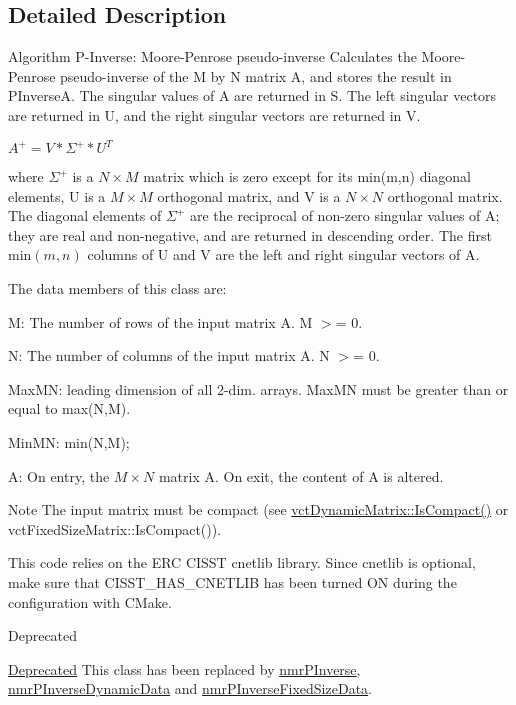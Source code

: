 \subsection{Detailed Description}
Algorithm P-\/\-Inverse\-: Moore-\/\-Penrose pseudo-\/inverse Calculates the Moore-\/\-Penrose pseudo-\/inverse of the M by N matrix A, and stores the result in P\-Inverse\-A. The singular values of A are returned in S. The left singular vectors are returned in U, and the right singular vectors are returned in V.

$ A^{+} = V * \Sigma^{+} * U^{T} $

where $ \Sigma^{+} $ is a $ N \times M $ matrix which is zero except for its min(m,n) diagonal elements, U is a $ M \times M $ orthogonal matrix, and V is a $ N \times N $ orthogonal matrix. The diagonal elements of $ \Sigma^{+} $ are the reciprocal of non-\/zero singular values of A; they are real and non-\/negative, and are returned in descending order. The first $ \mbox{min}(m,n) $ columns of U and V are the left and right singular vectors of A.

The data members of this class are\-:


\begin{DoxyItemize}
\item M\-: The number of rows of the input matrix A. M $>$= 0.
\item N\-: The number of columns of the input matrix A. N $>$= 0.
\item Max\-M\-N\-: leading dimension of all 2-\/dim. arrays. Max\-M\-N must be greater than or equal to max(\-N,\-M).
\item Min\-M\-N\-: min(\-N,\-M);
\item A\-: On entry, the $ M \times N $ matrix A. On exit, the content of A is altered.
\end{DoxyItemize}

\begin{DoxyNote}{Note}
The input matrix must be compact (see \hyperlink{classvct_dynamic_const_matrix_base_ac061c634b765bbd24e2772375c4578a1}{vct\-Dynamic\-Matrix\-::\-Is\-Compact()} or vct\-Fixed\-Size\-Matrix\-::\-Is\-Compact()).

This code relies on the E\-R\-C C\-I\-S\-S\-T cnetlib library. Since cnetlib is optional, make sure that C\-I\-S\-S\-T\-\_\-\-H\-A\-S\-\_\-\-C\-N\-E\-T\-L\-I\-B has been turned O\-N during the configuration with C\-Make.
\end{DoxyNote}
\begin{DoxyRefDesc}{Deprecated}
\item[\hyperlink{deprecated__deprecated000002}{Deprecated}]This class has been replaced by \hyperlink{nmr_p_inverse_8h_a0694f8540c064c2aa6d8dbe488238462}{nmr\-P\-Inverse}, \hyperlink{classnmr_p_inverse_dynamic_data}{nmr\-P\-Inverse\-Dynamic\-Data} and \hyperlink{classnmr_p_inverse_fixed_size_data}{nmr\-P\-Inverse\-Fixed\-Size\-Data}. \end{DoxyRefDesc}


